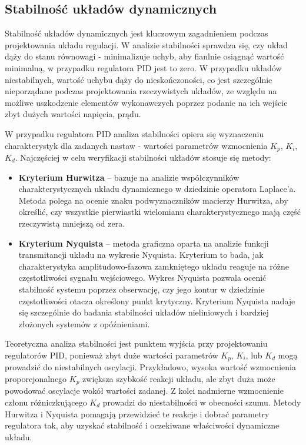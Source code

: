 \subsection{Stabilność układów dynamicznych}
\label{sek:stab}

Stabilność układów dynamicznych jest kluczowym zagadnieniem podczas projektowania układu regulacji. W analizie stabilności sprawdza się, czy układ dąży do stanu równowagi - minimalizuje uchyb, aby fianlnie osiągnąć wartość minimalną, w przypadku regulatora PID jest to zero. W przypadku układów niestabilnych, wartość uchybu dąży do nieskończoności, co jest szczególnie nieporządane podczas projektowania rzeczywistych układów, ze względu na możliwe uszkodzenie elementów wykonawczych poprzez podanie na ich wejście zbyt dużych wartości napięcia, prądu. 

W przypadku regulatora PID analiza stabilności opiera się wyznaczeniu charakterystyk dla zadanych nastaw - wartości parametrów wzmocnienia $K_p$, $K_i$, $K_d$. Najczęściej w celu weryfikacji stabilności układów stosuje się metody:
\begin{itemize}
    \item \textbf{Kryterium Hurwitza} – bazuje na analizie współczynników charakterystycznych układu dynamicznego w dziedzinie operatora Laplace’a. Metoda polega na ocenie znaku podwyznaczników macierzy Hurwitza, aby określić, czy wszystkie pierwiastki wielomianu charakterystycznego mają część rzeczywistą mniejszą od zera.
    \item \textbf{Kryterium Nyquista} – metoda graficzna oparta na analizie funkcji transmitancji układu na wykresie Nyquista. Kryterium to bada, jak charakterystyka amplitudowo-fazowa zamkniętego układu reaguje na różne częstotliwości sygnału wejściowego. Wykres Nyquista pozwala ocenić stabilność systemu poprzez obserwację, czy jego kontur w dziedzinie częstotliwości otacza określony punkt krytyczny. Kryterium Nyquista nadaje się szczególnie do badania stabilności układów nieliniowych i bardziej złożonych systemów z opóźnieniami.
\end{itemize}

Teoretyczna analiza stabilności jest punktem wyjścia przy projektowaniu regulatorów PID, ponieważ zbyt duże wartości parametrów $K_p$, $K_i$, lub $K_d$ mogą prowadzić do niestabilnych oscylacji. Przykładowo, wysoka wartość wzmocnienia proporcjonalnego $K_p$ zwiększa szybkość reakcji układu, ale zbyt duża może powodować oscylacje wokół wartości zadanej. Z kolei nadmierne wzmocnienie członu różniczkującego $K_d$ prowadzi do niestabilności w obecności szumu. Metody Hurwitza i Nyquista pomagają przewidzieć te reakcje i dobrać parametry regulatora tak, aby uzyskać stabilność i oczekiwane właściwości dynamiczne układu.

